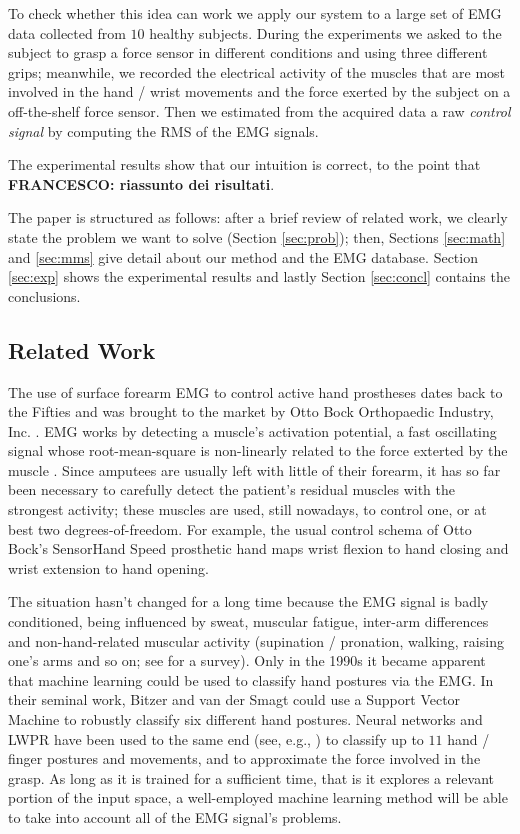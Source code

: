 To check whether this idea can work we apply our system to a large set
of EMG data collected from $10$ healthy subjects. During the
experiments we asked to the subject to grasp a force sensor in
different conditions and using three different grips; meanwhile, we
recorded the electrical activity of the muscles that are most involved
in the hand / wrist movements and the force exerted by the subject on
a off-the-shelf force sensor. Then we estimated from the acquired data
a raw \emph{control signal} by computing the RMS of the EMG signals.

The experimental results show that our intuition is correct, to the
point that \textbf{FRANCESCO: riassunto dei risultati}.

The paper is structured as follows: after a brief review of related
work, we clearly state the problem we want to solve (Section
\ref{sec:prob}); then, Sections \ref{sec:math} and \ref{sec:mms} give
detail about our method and the EMG database. Section \ref{sec:exp}
shows the experimental results and lastly Section \ref{sec:concl}
contains the conclusions.

\subsection{Related Work}

The use of surface forearm EMG to control active hand prostheses dates
back to the Fifties and was brought to the market by Otto Bock
Orthopaedic Industry, Inc. \cite{history}. EMG works by detecting a
muscle's activation potential, a fast oscillating signal whose
root-mean-square is non-linearly related to the force exterted by the
muscle \cite{deluca}. Since amputees are usually left with little of
their forearm, it has so far been necessary to carefully detect the
patient's residual muscles with the strongest activity; these muscles
are used, still nowadays, to control one, or at best two
degrees-of-freedom. For example, the usual control schema of Otto
Bock's SensorHand Speed prosthetic hand maps wrist flexion to hand
closing and wrist extension to hand opening.

The situation hasn't changed for a long time because the EMG signal is
badly conditioned, being influenced by sweat, muscular fatigue,
inter-arm differences and non-hand-related muscular activity
(supination / pronation, walking, raising one's arms and so on; see
\cite{zecca} for a survey). Only in the 1990s it became apparent that
machine learning could be used to classify hand postures via the
EMG. In their seminal work, Bitzer and van der Smagt \cite{smagt}
could use a Support Vector Machine to robustly classify six different
hand postures. Neural networks and LWPR \cite{lwpr} have been used to
the same end (see, e.g., \cite{2008.ICRA,2008.BioCyb,Sebelius2005}) to
classify up to $11$ hand / finger postures and movements, and to
approximate the force involved in the grasp. As long as it is trained
for a sufficient time, that is it explores a relevant portion of the
input space, a well-employed machine learning method will be able to
take into account all of the EMG signal's problems.

